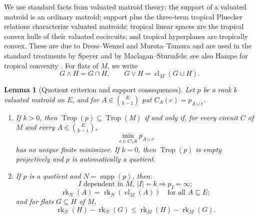 \documentclass[12pt]{article}
\newtheorem{lemma}[theorem]{Lemma}
\theoremstyle{definition}
\newcommand{\Trop}{\operatorname{Trop}}
\newcommand{\rk}{\operatorname{rk}}
\newcommand{\cl}{\operatorname{cl}}
\newcommand{\supp}{\operatorname{supp}}
\newcommand{\binomE}[1]{\binom{E}{#1}}
\begin{document}
We use standard facts from valuated matroid theory: the support of a valuated matroid is an ordinary matroid; support plus the three-term tropical Pluecker relations characterize valuated matroids; tropical linear spaces are the tropical convex hulls of their valuated cocircuits; and tropical hyperplanes are tropically convex.  These are due to Dress--Wenzel and Murota--Tamura and are used in the standard treatments by Speyer and by Maclagan--Sturmfels; see also Hampe for tropical convexity \cite{DW92,MT01,Speyer08,MS15,Hampe15}.  For flats of \(M\), we write
\[
G\wedge H=G\cap H,\qquad G\vee H=\cl_M(G\cup H).
\]

\begin{lemma}[Quotient criterion and support consequences]\label{lem:quotient}
Let \(p\) be a rank \(k\) valuated matroid on \(E\), and for \(A\in\binomE{k-1}\) put \(C_A(e)=p_{A\cup e}\).
\begin{enumerate}
\item If \(k>0\), then \(\Trop(p)\subseteq \Trop(M)\) if and only if, for every circuit \(C\) of \(M\) and every \(A\in\binomE{k-1}\),
\[
\min_{c\in C\setminus A}p_{A\cup c}
\]
has no unique finite minimizer.  If \(k=0\), then \(\Trop(p)\) is empty projectively and \(p\) is automatically a quotient.
\item If \(p\) is a quotient and \(N=\supp(p)\), then:
\[
I\text{ dependent in }M,\ |I|=k \Longrightarrow p_I=\infty;
\]
\[
\rk_N(A)=\rk_N(\cl_M(A))\quad\text{for all }A\subseteq E;
\]
and for flats \(G\subseteq H\) of \(M\),
\[
\rk_N(H)-\rk_N(G)\le \rk_M(H)-\rk_M(G).
\]
\end{enumerate}
\end{lemma}
\end{document}
